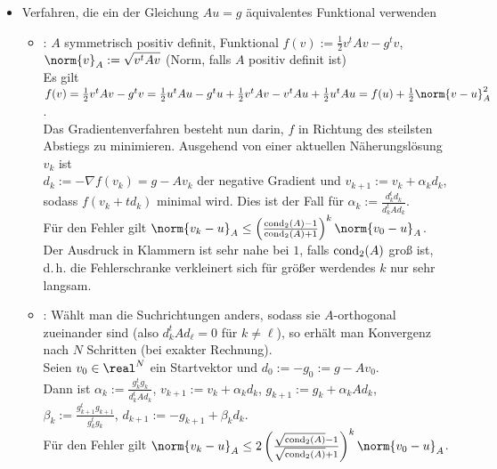 \begin{Bem}
\begin{itemize}
        \item
        Verfahren, die ein der Gleichung $Au = g$ äquivalentes Funktional
        verwenden
        \begin{itemize}
            \item
            :
            $A$ symmetrisch positiv definit,
            Funktional $f(v) := \frac{1}{2} v^t A v - g^t v$,
             $\norm{v}_A := \sqrt{v^t A v}$
            (Norm, falls $A$ positiv definit ist)\\
            Es gilt $f(v) = \frac{1}{2} v^t A v - g^t v =
            \frac{1}{2} u^t A u - g^t u +
            \frac{1}{2} v^t A v - v^t A u + \frac{1}{2} u^t A u =
            f(u) + \frac{1}{2} \norm{v - u}_A^2$.\\
            Das Gradientenverfahren besteht nun darin, $f$ in Richtung
            des steilsten Abstiegs zu minimieren.
            Ausgehend von einer aktuellen Näherungslösung $v_k$ ist\\
            $d_k := -\nabla f(v_k) = g - Av_k$
            der negative Gradient und
            $v_{k+1} := v_k + \alpha_k d_k$, sodass
            $f(v_k + t d_k)$ minimal wird.
            Dies ist der Fall für
            $\alpha_k := \frac{d_k^t d_k}{d_k^t A d_k}$.\\
            Für den Fehler gilt
            $\norm{v_k - u}_A \le
            \left(\frac{\cond_2(A) - 1}{\cond_2(A) + 1}\right)^k
            \norm{v_0 - u}_A$.
            Der Ausdruck in Klammern ist sehr nahe bei $1$, falls
            $\operatorname{cond}_2(A)$ groß ist,
            d.\,h. die Fehlerschranke verkleinert sich für größer werdendes $k$
            nur sehr langsam.

            \item
            :
            Wählt man die Suchrichtungen anders, sodass sie $A$-orthogonal
            zueinander sind (also $d_k^t A d_\ell = 0$ für $k \not= \ell$),
            so erhält man Konvergenz nach $N$ Schritten
            (bei exakter Rechnung).\\
            Seien $v_0 \in \real^N$ ein Startvektor und
            $d_0 := -g_0 := g - Av_0$.\\
            Dann ist
            $\alpha_k := \frac{g_k^t g_k}{d_k^t A d_k}$,\qquad
            $v_{k+1} := v_k + \alpha_k d_k$,\qquad
            $g_{k+1} := g_k + \alpha_k A d_k$,\\
            $\beta_k := \frac{g_{k+1}^t g_{k+1}}{g_k^t g_k}$,\qquad
            $d_{k+1} := -g_{k+1} + \beta_k d_k$.\\
            Für den Fehler gilt
            $\norm{v_k - u}_A \le
            2 \left(\frac{\sqrt{\cond_2(A)} - 1}
            {\sqrt{\cond_2(A)} + 1}\right)^k \norm{v_0 - u}_A$.


\end{itemize}
\end{itemize}
\end{Bem}
